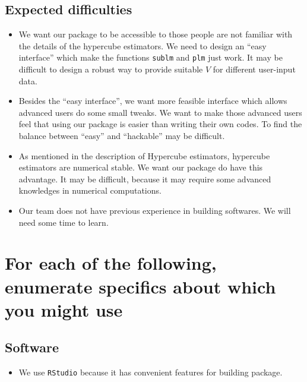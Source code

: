 \documentclass[draft]{article}
\begin{document}
\subsection{Expected difficulties}
\begin{itemize}

	\item We want our package to be accessible to those people are not familiar with the details of the hypercube estimators. We need to design an ``easy interface'' which make the functions {\tt sublm} and {\tt plm} just work. It may be difficult to design a robust way to provide suitable $V$ for different user-input data.

	\item Besides the ``easy interface'', we want more feasible interface which allows advanced users do some small tweaks. We want to make those advanced users feel that using our package is easier than writing their own codes. To find the balance between ``easy'' and ``hackable'' may be difficult.

	\item As mentioned in the description of Hypercube estimators, hypercube estimators are numerical stable. We want our package do have this advantage. It may be difficult, because it may require some advanced knowledges in numerical computations.

	\item Our team does not have previous experience in building softwares. We will need some time to learn.

\end{itemize}


\section{For each of the following, enumerate specifics about which you might use}


\subsection{Software}
\begin{itemize}
	\item We use \texttt{RStudio} because it has convenient features for building package.
\end{itemize}






 
\end{document}
